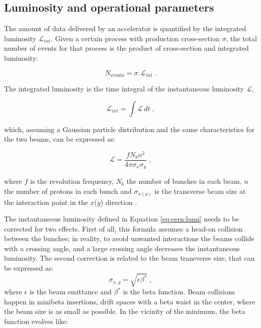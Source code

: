 \subsection{Luminosity and operational parameters}

The amount of data delivered by an accelerator is quantified by the integrated luminosity $\mathcal{L}_{int}$.
Given a certain process with production cross-section $\sigma$, the total number of events for that process is the product of cross-section and integrated luminosity:

\begin{equation}
\label{eq:cern:nev}
N_{\mathrm{events}} = \sigma \,\, \mathcal{L}_{int} \; .
\end{equation}

The integrated luminosity is the time integral of the instantaneous luminosity $\mathcal{L}$, 

\begin{equation}
\label{eq:cern:intlumi}
\mathcal{L}_{int} = \int \mathcal{L} \, dt \; ,
\end{equation}

\noindent which, assuming a Gaussian particle distribution and the same characteristics for the two beams, can be expressed as:

\begin{equation}
\mathcal{L}=\frac{f N_b n^2}{4 \pi \sigma_{x}\sigma_{y} } \; ,
\label{eq:cern:lumi}
\end{equation}

\noindent where $f$ is the revolution frequency, $N_b$ the number of bunches in each beam, $n$ the number of protons in each bunch and $\sigma_{x(y)}$  is the transverse beam size at the interaction point in the $x$($y$) direction . 

The instantaneous luminosity defined in Equation \ref{eq:cern:lumi} needs to be corrected for two effects. First of all, this formula assumes a head-on collision between the bunches; in reality, to avoid unwanted interactions the beams collide with a crossing angle, and a large crossing angle decreases the instantaneous luminosity. The second correction is related to the beam transverse size, that can be expressed as:
\begin{equation}
\sigma_{x,y} = \sqrt{  \epsilon \beta^* } \; ,
\end{equation}
where $\epsilon$ is the beam emittance and $\beta^*$ is the beta function. Beam collisions happen in minibeta insertions, drift spaces with a beta waist in the center, where the beam size is as small as possible. In the vicinity of the minimum, the beta function evolves like:

